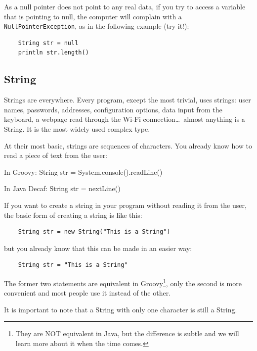As a null pointer does not point to any real data, if you try to
access a variable that is pointing to null, the computer will complain
with a \verb+NullPointerException+, as in the following example 
(try it!): 

\begin{verbatim}
    String str = null
    println str.length()
\end{verbatim}



\subsection{String}
\label{sec:string}

Strings are everywhere. Every program, except the most trivial, uses
strings: user names, passwords, addresses, configuration options, data
input from the keyboard, a webpage read through the Wi-Fi
connection\ldots~almost anything is a String. It is the most widely
used complex type. 

At their most basic, strings are sequences of characters. You already
know how to read a piece of text from the user: 

\begin{description}
   \item{In Groovy:} String str = System.console().readLine()
   \item{In Java Decaf: } String str = nextLine()
\end{description}

If you want to create a string in your program without reading it from
the user, the basic form of creating a string is like this: 

\begin{verbatim}
    String str = new String("This is a String")
\end{verbatim}

but you already know that this can be made in an easier way: 

\begin{verbatim}
    String str = "This is a String"
\end{verbatim}

The former two statements are equivalent in Groovy\footnote{They are
  NOT equivalent in Java, but the difference is subtle and we will
  learn more about it when the time comes.}, 
only the second is more convenient and most people use it
instead of the other. 

It is important to note that a String with only one character is
still a String. 

